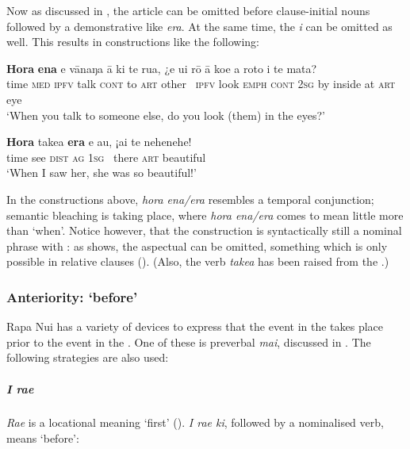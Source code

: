 Now as discussed in , the article can be omitted before clause-initial nouns followed by a demonstrative like \textit{era}. At the same time, the  \textit{{\ꞌ}i} can be omitted as well. This results in constructions like the following:

\ea\label{ex:11.232}
\gll \textbf{Hora} \textbf{ena} e vānaŋa {\ꞌ}ā ki te rua, ¿e u{\ꞌ}i rō {\ꞌ}ā koe  a roto i te mata?\\
time \textsc{med} \textsc{ipfv} talk \textsc{cont} to \textsc{art} other ~\textsc{ipfv} look \textsc{emph} \textsc{cont} \textsc{2sg}  by inside at \textsc{art} eye\\

\glt 
‘When you talk to someone else, do you look (them) in the eyes?’ \textstyleExampleref{[R209.027]} 
\z

\ea\label{ex:11.233}
\gll \textbf{Hora} take{\ꞌ}a \textbf{era} e au, ¡{\ꞌ}ai te nehenehe!\\
time see \textsc{dist} \textsc{ag} \textsc{1sg} ~there \textsc{art} beautiful\\

\glt
‘When I saw her, she was so beautiful!’ \textstyleExampleref{[R413.099]} 
\z

In the constructions above, \textit{hora ena/era} resembles a temporal conjunction; semantic bleaching is taking place, where \textit{hora ena/era} comes to mean little more than ‘when’. Notice however, that the construction is syntactically still a nominal phrase with : as  shows, the aspectual can be omitted, something which is only possible in relative clauses (). (Also, the verb \textit{take{\ꞌ}a} has been raised from the .)

\subsubsection{Anteriority: ‘before’}\label{sec:11.6.2.4}

Rapa Nui has a variety of devices to express that the event in the  takes place prior to the event in the . One of these is preverbal \textit{mai}, discussed in . The following strategies are also used:

\subparagraph{\textit{{\ꞌ}I ra{\ꞌ}e}} \textit{Ra{\ꞌ}e} is a locational meaning ‘first’ (). \textit{{\ꞌ}I ra{\ꞌ}e ki}, followed by a nominalised verb, means ‘before’:

